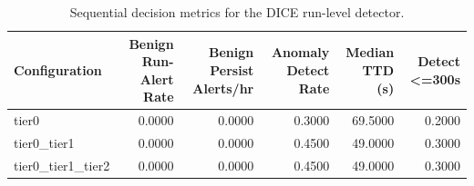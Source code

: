 \begin{table}[t]
\centering
\caption{Sequential decision metrics for the DICE run-level detector.}
\label{tab:dice_sequential_metrics}
\footnotesize
\begin{tabular}{lrrrrr}
\toprule
Configuration & Benign Run-Alert Rate & Benign Persist Alerts/hr & Anomaly Detect Rate & Median TTD (s) & Detect <=300s \\
\midrule
tier0 & 0.0000 & 0.0000 & 0.3000 & 69.5000 & 0.2000 \\
tier0_tier1 & 0.0000 & 0.0000 & 0.4500 & 49.0000 & 0.3000 \\
tier0_tier1_tier2 & 0.0000 & 0.0000 & 0.4500 & 49.0000 & 0.3000 \\
\bottomrule
\end{tabular}

\end{table}
